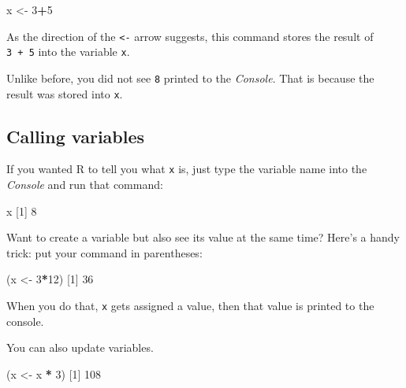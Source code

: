 \documentclass[
]{book}
\newenvironment{Shaded}{\begin{snugshade}}{\end{snugshade}}
\newcommand{\DecValTok}[1]{\textcolor[rgb]{0.00,0.00,0.81}{#1}}
\newcommand{\NormalTok}[1]{#1}
\newcommand{\OtherTok}[1]{\textcolor[rgb]{0.56,0.35,0.01}{#1}}
\newcommand{\SpecialCharTok}[1]{\textcolor[rgb]{0.81,0.36,0.00}{\textbf{#1}}}
\begin{document}
\begin{Shaded}
\begin{Highlighting}[]
\NormalTok{x }\OtherTok{\textless{}{-}} \DecValTok{3}\SpecialCharTok{+}\DecValTok{5}
\end{Highlighting}
\end{Shaded}

As the direction of the \texttt{\textless{}-} arrow suggests, this command stores the result of \texttt{3\ +\ 5} into the variable \texttt{x}.

Unlike before, you did not see \texttt{8} printed to the \emph{Console}. That is because the result was stored into \texttt{x}.

\subsection*{Calling variables}\label{calling-variables}

If you wanted R to tell you what \texttt{x} is, just type the variable name into the \emph{Console} and run that command:

\begin{Shaded}
\begin{Highlighting}[]
\NormalTok{x}
\NormalTok{[}\DecValTok{1}\NormalTok{] }\DecValTok{8}
\end{Highlighting}
\end{Shaded}

Want to create a variable but also see its value at the same time? Here's a handy trick: put your command in parentheses:

\begin{Shaded}
\begin{Highlighting}[]
\NormalTok{(x }\OtherTok{\textless{}{-}} \DecValTok{3}\SpecialCharTok{*}\DecValTok{12}\NormalTok{)}
\NormalTok{[}\DecValTok{1}\NormalTok{] }\DecValTok{36}
\end{Highlighting}
\end{Shaded}

When you do that, \texttt{x} gets assigned a value, then that value is printed to the console.

You can also update variables.

\begin{Shaded}
\begin{Highlighting}[]
\NormalTok{(x }\OtherTok{\textless{}{-}}\NormalTok{ x }\SpecialCharTok{*} \DecValTok{3}\NormalTok{)}
\NormalTok{[}\DecValTok{1}\NormalTok{] }\DecValTok{108}
\end{Highlighting}
\end{Shaded}
\end{document}
